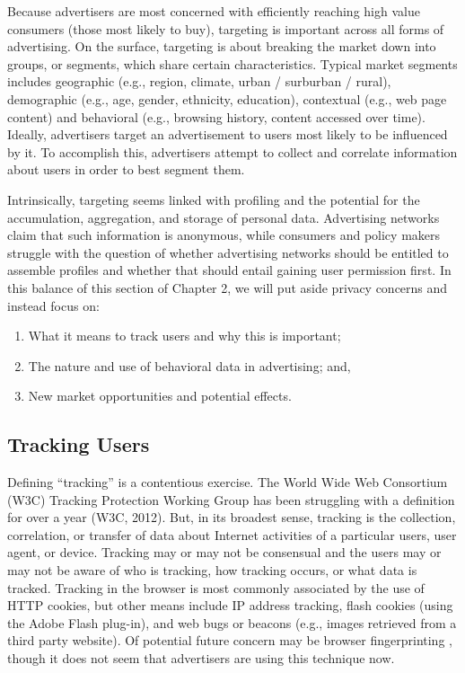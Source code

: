 \begin{sloppier}
Because advertisers are most concerned with efficiently reaching high value consumers (those most likely to buy), targeting is important across all forms of advertising. On the surface, targeting is about breaking the market down into groups, or segments, which share certain characteristics. Typical market segments includes geographic (e.g., region, climate, urban / surburban / rural), demographic (e.g., age, gender, ethnicity, education), contextual (e.g., web page content) and behavioral (e.g., browsing history, content accessed over time). Ideally, advertisers target an advertisement to users most likely to be influenced by it. To accomplish this, advertisers attempt to collect and correlate information about users in order to best segment them. 
\end{sloppier}


Intrinsically, targeting seems linked with profiling and the potential for the accumulation, aggregation, and storage of personal data. Advertising networks claim that such information is anonymous, while consumers and policy makers struggle with the question of whether advertising networks should be entitled to assemble profiles and whether that should entail gaining user permission first. In this balance of this section of Chapter 2, we will put aside privacy concerns and instead focus on:

\begin{enumerate}
\item What it means to track users and why this is important;
\item The nature and use of behavioral data in advertising; and,
\item New market opportunities and potential effects.
\end{enumerate}


\subsection{Tracking Users}
\label{trackingusers}

Defining ``tracking'' is a contentious exercise. The World Wide Web Consortium (W3C) Tracking Protection Working Group has been struggling with a definition for over a year (W3C, 2012). But, in its broadest sense, tracking is the collection, correlation, or transfer of data about Internet activities of a particular users, user agent, or device. Tracking may or may not be consensual and the users may or may not be aware of who is tracking, how tracking occurs, or what data is tracked. Tracking in the browser is most commonly associated by the use of HTTP cookies, but other means include IP address tracking, flash cookies (using the Adobe Flash plug-in), and web bugs or beacons (e.g., images retrieved from a third party website). Of potential future concern may be browser fingerprinting  \citep{Eckersley:2010uj},  though it does not seem that advertisers are using this technique now.

